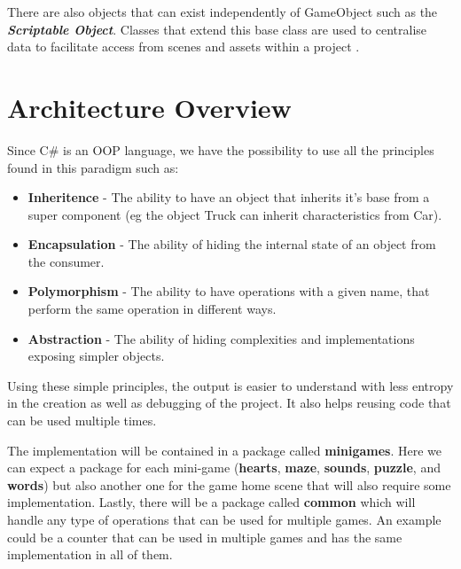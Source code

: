 There are also objects that can exist independently of GameObject such as the \textbf{\textit{Scriptable Object}}. Classes that extend this base class are used to centralise data to facilitate access from scenes and assets within a project \cite{unityDocScriptableObj}.



\newpage

\section{Architecture Overview}
\label{arqOverview}
Since C\# is an OOP language, we have the possibility to use all the principles found in this paradigm such as:

\begin{itemize}
    \item \textbf{Inheritence} - The ability to have an object that inherits it's base from a super component (eg the object Truck can inherit characteristics from Car).
    \item \textbf{Encapsulation} - The ability of hiding the internal state of an object from the consumer.
    \item \textbf{Polymorphism} - The ability to have operations with a given name, that perform the same operation in different ways.
    \item \textbf{Abstraction} - The ability of hiding complexities and implementations exposing simpler objects.
\end{itemize}

Using these simple principles, the output is easier to understand with less entropy in the creation as well as debugging of the project. It also helps reusing code that can be used multiple times.

The implementation will be contained in a package called \textbf{minigames}. Here we can expect a package for each mini-game (\textbf{hearts}, \textbf{maze}, \textbf{sounds}, \textbf{puzzle}, and \textbf{words}) but also another one for the game home scene that will also require some implementation. Lastly, there will be a package called \textbf{common} which will handle any type of operations that can be used for multiple games. An example could be a counter that can be used in multiple games and has the same implementation in all of them.


